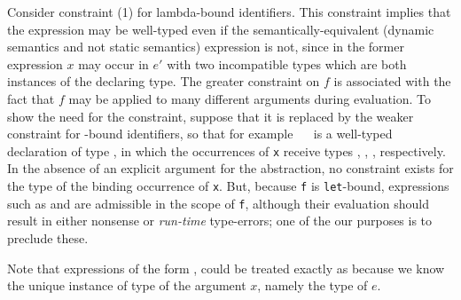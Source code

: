 \documentclass[11pt]{article}
\begin{document}

        Consider constraint (1) for lambda-bound identifiers.  This constraint
	implies that the expression  may be
	well-typed even if the semantically-equivalent (dynamic
        semantics and not static semantics) expression  is not, since in the former expression $x$ may
	occur in $e'$ with two incompatible types which are both instances of
	the declaring type.  The greater constraint on $f$ is associated with
	the fact that $f$ may be applied to many different arguments during
	evaluation.  To show the need for the constraint, suppose that it is
	replaced by the weaker constraint for -bound identifiers, so
	that for example
	\
	\
	is a well-typed declaration of type , in which the
	occurrences of {\tt x} receive types , , ,
	\ttQ{Int -> Int} respectively.  In the absence of an explicit argument for
	the abstraction, no constraint exists for the type of the binding
	occurrence of {\tt x}.  But, because {\tt f} is {\tt let}-bound,
	expressions such as \ttQ{f true} and \ttQ{f `dog`} are admissible in the
	scope of {\tt f}, although their evaluation should result in either
	nonsense or {\it run-time\/} type-errors; one of the our purposes is to
	preclude these.

	Note that expressions of the form
	, could be treated exactly as \ttQ{let
	$x$=$e$ in $e'$} because we know the unique instance of type of the
	argument $x$, namely the type of $e$.



\end{document}
